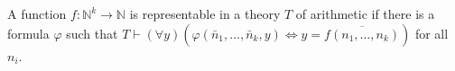 A function $f: \mathbb{N}^k \to \mathbb{N}$ is representable in a theory $T$ of arithmetic if there is a formula $\varphi$ such that $T \vdash (\forall y)(\varphi(\bar{n}_1,\ldots,\bar{n}_k, y) \Leftrightarrow y = \overline{f(n_1,\ldots,n_k)})$ for all $n_i$.
